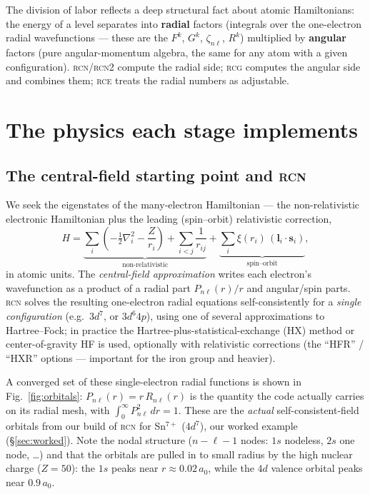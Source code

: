 \documentclass[11pt]{article}
\newcommand{\Fk}{F^{k}}
\newcommand{\Gk}{G^{k}}
\newcommand{\Rk}{R^{k}}
\newcommand{\znl}{\zeta_{n\ell}}
\newcommand{\prog}[1]{\textsc{#1}}
\begin{document}
The division of labor reflects a deep structural fact about atomic Hamiltonians:
the energy of a level separates into \textbf{radial} factors (integrals over the
one-electron radial wavefunctions --- these are the $\Fk$, $\Gk$, $\znl$,
$\Rk$) multiplied by \textbf{angular} factors (pure angular-momentum algebra,
the same for any atom with a given configuration). \prog{rcn}/\prog{rcn2}
compute the radial side; \prog{rcg} computes the angular side and combines them;
\prog{rce} treats the radial numbers as adjustable.

\section{The physics each stage implements}

\subsection{The central-field starting point and \prog{rcn}}

We seek the eigenstates of the many-electron Hamiltonian --- the non-relativistic
electronic Hamiltonian plus the leading (spin--orbit) relativistic correction,
\begin{equation}
H = \underbrace{\sum_{i}\left(-\tfrac{1}{2}\nabla_i^2 - \frac{Z}{r_i}\right)
  + \sum_{i<j}\frac{1}{r_{ij}}}_{\text{non-relativistic}}
  + \underbrace{\sum_i \xi(r_i)\,(\mathbf{l}_i\!\cdot\!\mathbf{s}_i)}_{\text{spin--orbit}},
\label{eq:H}
\end{equation}
in atomic units. The \emph{central-field approximation} writes each electron's
wavefunction as a product of a radial part $P_{n\ell}(r)/r$ and angular/spin
parts. \prog{rcn} solves the resulting one-electron radial equations
self-consistently for a \emph{single configuration} (e.g.\ $3d^7$, or
$3d^6 4p$), using one of several approximations to Hartree--Fock; in practice
the Hartree-plus-statistical-exchange (HX) method or center-of-gravity HF is
used, optionally with relativistic corrections (the ``HFR'' / ``HXR'' options
--- important for the iron group and heavier).

A converged set of these single-electron radial functions is shown in
Fig.~\ref{fig:orbitals}: $P_{n\ell}(r) = r\,R_{n\ell}(r)$ is the quantity the
code actually carries on its radial mesh, with $\int_0^\infty P_{n\ell}^2\,dr=1$.
These are the \emph{actual} self-consistent-field orbitals from our build of
\prog{rcn} for Sn$^{7+}$ ($4d^7$), our worked example (\S\ref{sec:worked}). Note
the nodal structure ($n-\ell-1$ nodes: $1s$ nodeless, $2s$ one node, \dots) and
that the orbitals are pulled in to small radius by the high nuclear charge
($Z=50$): the $1s$ peaks near $r\approx0.02\,a_0$, while the $4d$ valence orbital
peaks near $0.9\,a_0$.
\end{document}
